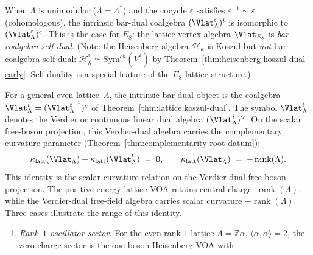 \begin{remark}
\label{rem:lattice:self-duality}
When $\Lambda$ is unimodular ($\Lambda = \Lambda^*$) and the cocycle
$\varepsilon$ satisfies $\varepsilon^{-1} \sim \varepsilon$ (cohomologous),
the intrinsic bar-dual coalgebra
$(\Vlat_\Lambda^\varepsilon)^i$ is isomorphic to
$(\Vlat_\Lambda^\varepsilon)^c$. This is the case
for $E_8$: the lattice vertex algebra $\Vlat_{E_8}$ is
\emph{bar-coalgebra self-dual}. (Note: the Heisenberg algebra $\mathcal{H}_\kappa$ is
Koszul but \emph{not} bar-coalgebra self-dual:
$\mathcal{H}_\kappa^! \simeq \mathrm{Sym}^{ch}(V^*)$
by Theorem~\ref{thm:heisenberg-koszul-dual-early}. Self-duality is a special
feature of the $E_8$ lattice structure.)
\end{remark}

\begin{remark}
\label{rem:lattice:koszul-dual-kappa}%
%
\ClaimStatusConditional
For a general even lattice~$\Lambda$, the intrinsic bar-dual object is
the coalgebra
$\Vlat_\Lambda^i=(\Vlat_\Lambda^{\varepsilon^{-1}})^c$
of Theorem~\ref{thm:lattice:koszul-dual}. The symbol
$\Vlat_\Lambda^!$ denotes the Verdier or continuous linear dual
algebra $(\Vlat_\Lambda^i)^\vee$. On the scalar free-boson
projection, this Verdier-dual algebra carries the complementary
curvature parameter
(Theorem~\ref{thm:complementarity-root-datum}):
\begin{equation}\label{eq:lattice:kappa-complementarity}
\kappa_{\mathrm{latt}}(\Vlat_\Lambda)
+ \kappa_{\mathrm{latt}}(\Vlat_\Lambda^!)
\;=\; 0,
\qquad
\kappa_{\mathrm{latt}}(\Vlat_\Lambda^!)
\;=\; -\operatorname{rank}(\Lambda).
\end{equation}
This identity is the scalar curvature relation on the Verdier-dual
free-boson projection.  The positive-energy lattice VOA retains central
charge~$\operatorname{rank}(\Lambda)$, while the Verdier-dual free-field
algebra carries scalar curvature $-\operatorname{rank}(\Lambda)$. Three
cases illustrate the range of this identity.
\begin{enumerate}[label=\textup{(\roman*)}]
\item \emph{Rank~$1$ oscillator sector.}
For the even rank-$1$ lattice
$\Lambda=\mathbb Z\alpha$, $\langle\alpha,\alpha\rangle=2$, the
zero-charge sector is the one-boson Heisenberg VOA with

\end{enumerate}
\end{remark}
